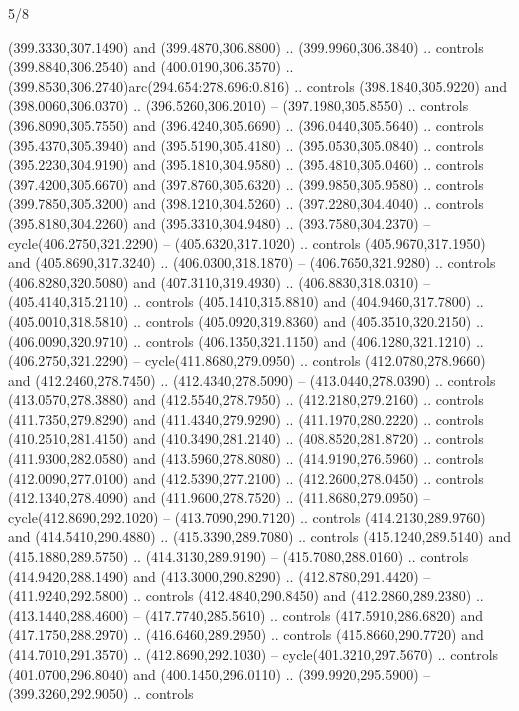 \begin{flagdescription}{5/8}
\begin{scope}[xshift=0.5\flaglength,yshift=0.5\flagwidth,scale=\flagwidth/475.63]
\begin{scope}[y=0.8pt, x=0.8pt, yscale=-1, xscale=1,shift={(-450,-300)}]
\begin{scope}[cm={{1.0,0.0,0.0,1.0,(-0.0002,0.12556)}},cm={{1.0,0.0,0.0,1.0,(0.00179,0.0)}}]
\begin{scope}[fill=c00863d]
  (399.3330,307.1490) and (399.4870,306.8800) .. (399.9960,306.3840) .. controls
  (399.8840,306.2540) and (400.0190,306.3570) ..
  (399.8530,306.2740)arc(294.654:278.696:0.816) .. controls (398.1840,305.9220)
  and (398.0060,306.0370) .. (396.5260,306.2010) -- (397.1980,305.8550) ..
  controls (396.8090,305.7550) and (396.4240,305.6690) .. (396.0440,305.5640) ..
  controls (395.4370,305.3940) and (395.5190,305.4180) .. (395.0530,305.0840) ..
  controls (395.2230,304.9190) and (395.1810,304.9580) .. (395.4810,305.0460) ..
  controls (397.4200,305.6670) and (397.8760,305.6320) .. (399.9850,305.9580) ..
  controls (399.7850,305.3200) and (398.1210,304.5260) .. (397.2280,304.4040) ..
  controls (395.8180,304.2260) and (395.3310,304.9480) .. (393.7580,304.2370) --
  cycle(406.2750,321.2290) -- (405.6320,317.1020) .. controls
  (405.9670,317.1950) and (405.8690,317.3240) .. (406.0300,318.1870) --
  (406.7650,321.9280) .. controls (406.8280,320.5080) and (407.3110,319.4930) ..
  (406.8830,318.0310) -- (405.4140,315.2110) .. controls (405.1410,315.8810) and
  (404.9460,317.7800) .. (405.0010,318.5810) .. controls (405.0920,319.8360) and
  (405.3510,320.2150) .. (406.0090,320.9710) .. controls (406.1350,321.1150) and
  (406.1280,321.1210) .. (406.2750,321.2290) -- cycle(411.8680,279.0950) ..
  controls (412.0780,278.9660) and (412.2460,278.7450) .. (412.4340,278.5090) --
  (413.0440,278.0390) .. controls (413.0570,278.3880) and (412.5540,278.7950) ..
  (412.2180,279.2160) .. controls (411.7350,279.8290) and (411.4340,279.9290) ..
  (411.1970,280.2220) .. controls (410.2510,281.4150) and (410.3490,281.2140) ..
  (408.8520,281.8720) .. controls (411.9300,282.0580) and (413.5960,278.8080) ..
  (414.9190,276.5960) .. controls (412.0090,277.0100) and (412.5390,277.2100) ..
  (412.2600,278.0450) .. controls (412.1340,278.4090) and (411.9600,278.7520) ..
  (411.8680,279.0950) -- cycle(412.8690,292.1020) -- (413.7090,290.7120) ..
  controls (414.2130,289.9760) and (414.5410,290.4880) .. (415.3390,289.7080) ..
  controls (415.1240,289.5140) and (415.1880,289.5750) .. (414.3130,289.9190) --
  (415.7080,288.0160) .. controls (414.9420,288.1490) and (413.3000,290.8290) ..
  (412.8780,291.4420) -- (411.9240,292.5800) .. controls (412.4840,290.8450) and
  (412.2860,289.2380) .. (413.1440,288.4600) -- (417.7740,285.5610) .. controls
  (417.5910,286.6820) and (417.1750,288.2970) .. (416.6460,289.2950) .. controls
  (415.8660,290.7720) and (414.7010,291.3570) .. (412.8690,292.1030) --
  cycle(401.3210,297.5670) .. controls (401.0700,296.8040) and
  (400.1450,296.0110) .. (399.9920,295.5900) -- (399.3260,292.9050) .. controls

\end{scope}
\end{scope}
\end{scope}
\end{scope}
\end{flagdescription}
